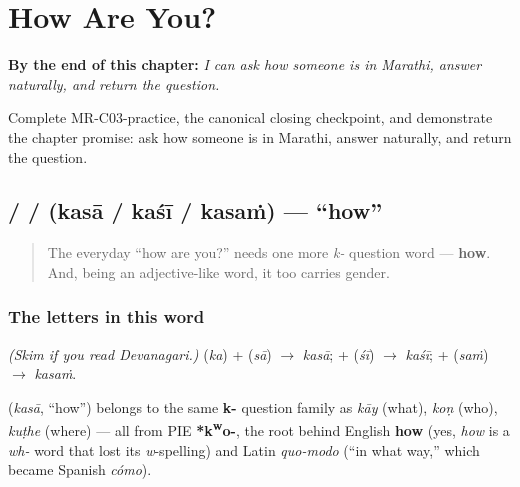 
\chapter{How Are You?}
\label{ch:responding}

\begin{chapteropening}
\textbf{By the end of this chapter:} \emph{I can ask how someone is in Marathi, answer naturally, and return the question.}

Complete MR-C03-practice, the canonical closing checkpoint, and demonstrate the chapter promise: ask how someone is in Marathi, answer naturally, and return the question.
\end{chapteropening}

\section[\texorpdfstring{\mr{कसा} / \mr{कशी} / \mr{कसं} (kasā / kaśī / kasaṁ)}{कसा / कशी / कसं (kasā / kaśī / kasaṁ)}]{ /  /  (kasā / kaśī / kasaṁ) — \textquotedblleft{}how\textquotedblright{}}

\label{lesson:MR-C03-kasa}



\begin{quote}
The everyday \textquotedblleft{}how are you?\textquotedblright{} needs one more \emph{k-} question word — \textbf{how}. And, being an adjective-like word, it too carries gender.
\end{quote}

\subsection*{The letters in this word}
\emph{(Skim if you read Devanagari.)} \textbf{} (\emph{ka}) + \textbf{} (\emph{sā}) $\to$ \textbf{} \emph{kasā}; \textbf{} + \textbf{} (\emph{śī}) $\to$ \textbf{} \emph{kaśī}; \textbf{} + \textbf{} (\emph{saṁ}) $\to$ \textbf{} \emph{kasaṁ}.

\begin{cousinweb}
\textbf{} (\emph{kasā}, \textquotedblleft{}how\textquotedblright{}) belongs to the same \textbf{k-} question family as \emph{kāy} (what), \emph{koṇ} (who), \emph{kuṭhe} (where) — all from PIE \textbf{*k\textsuperscript{w}o-}, the root behind English \textbf{how} (yes, \emph{how} is a \emph{wh-} word that lost its \emph{w}-spelling) and Latin \emph{quo-modo} (\textquotedblleft{}in what way,\textquotedblright{} which became Spanish \emph{cómo}).
\end{cousinweb}

